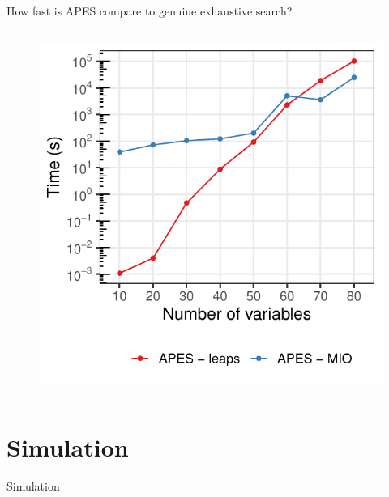 \documentclass[12pt,aspectratio=169]{beamer}
\begin{document}
\begin{frame}{How fast is APES compare to genuine exhaustive search?}
\begin{columns}
\begin{column}{0.5\linewidth}
\begin{figure}
{				\includegraphics[width=\linewidth]{leapsTimePlot_EcoSta_17_Apr_2019}
			}
		\end{figure}
	\end{column}
\end{columns}
\end{frame}


\section{Simulation}



\begin{frame}
\Huge{\color{themeBlue} Simulation}
\end{frame}
\end{document}
